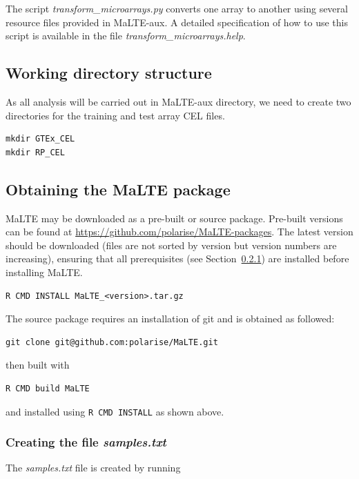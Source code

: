 \documentclass[a4paper,12pt]{article}
\begin{document}
The script \textit{transform\_microarrays.py} converts one array to another using several resource files provided in \textsf{MaLTE-aux}. A detailed specification of how to use this script is available in the file \textit{transform\_microarrays.help}.

\subsection{Working directory structure}
As all analysis will be carried out in \textsf{MaLTE-aux} directory, we need to create two directories for the training and test array CEL files. 

\begin{verbatim}
mkdir GTEx_CEL
mkdir RP_CEL
\end{verbatim}

\subsection{Obtaining the MaLTE package}

\textsf{MaLTE} may be downloaded as a pre-built or source package. Pre-built versions can be found at \url{https://github.com/polarise/MaLTE-packages}. The latest version should be downloaded (files are not sorted by version but version numbers are increasing), ensuring that all prerequisites (see Section~\ref{}) are installed before installing \textsf{MaLTE}.

\begin{verbatim}
R CMD INSTALL MaLTE_<version>.tar.gz
\end{verbatim} 

The source package requires an installation of \textsf{git} and is obtained as followed:
\begin{verbatim}
git clone git@github.com:polarise/MaLTE.git
\end{verbatim} 

then built with
\begin{verbatim}
R CMD build MaLTE
\end{verbatim}

and installed using \texttt{R CMD INSTALL} as shown above. 

\subsubsection{Creating the file \textit{samples.txt}}

The \textit{samples.txt} file is created by running
\end{document}
